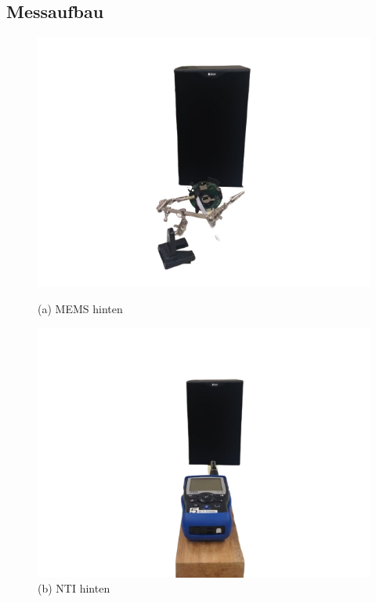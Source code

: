 \documentclass[12pt]{article}
\begin{document}
	\newpage
	\subsection*{Messaufbau} \label{Messaufbau}
		\begin{figure}[H] 
			\centering 
			\begin{minipage}
				{0.45\textwidth} 		\includegraphics[width=\linewidth]{MEMS_Hinten-removebg} \caption*{(a) MEMS hinten} 
			\end{minipage} 
			\hfill 
			\begin{minipage}
				{0.45\textwidth} \includegraphics[width=\linewidth]{NTI_Hinten-removebg} \caption*{(b) NTI hinten} 
			\end{minipage} 

\end{figure}
\end{document}
